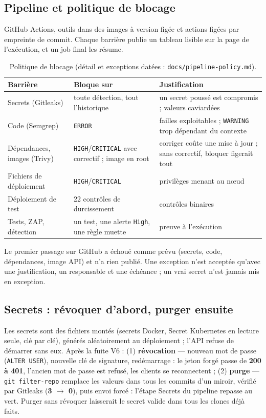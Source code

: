 \documentclass[11pt,a4paper]{article}
\newcommand{\code}[1]{\texttt{\small #1}}
\begin{document}
\subsection{Pipeline et politique de blocage}
GitHub Actions, outils dans des images à version figée et actions figées par empreinte de commit. Chaque
barrière publie un tableau lisible sur la page de l'exécution, et un job final les résume.

\begin{table}[H]
\small
\begin{tabularx}{\linewidth}{@{}L{3.6cm}L{4.2cm}Y@{}}
\toprule
\textbf{Barrière} & \textbf{Bloque sur} & \textbf{Justification} \\
\midrule
Secrets (Gitleaks) & toute détection, tout l'historique & un secret poussé est compromis ; valeurs caviardées \\
Code (Semgrep) & \code{ERROR} & failles exploitables ; \code{WARNING} trop dépendant du contexte \\
Dépendances, images (Trivy) & \code{HIGH}/\code{CRITICAL} avec correctif ; image en root & corriger coûte une mise à jour ; sans correctif, bloquer figerait tout \\
Fichiers de déploiement & \code{HIGH}/\code{CRITICAL} & privilèges menant au nœud \\
Déploiement de test & 22 contrôles de durcissement & contrôles binaires \\
Tests, ZAP, détection & un test, une alerte \code{High}, une règle muette & preuve à l'exécution \\
\bottomrule
\end{tabularx}
\caption{Politique de blocage (détail et exceptions datées : \code{docs/pipeline-policy.md}).}
\end{table}

Le premier passage sur GitHub a échoué comme prévu (secrets, code, dépendances, image API) et n'a rien
publié. Une exception n'est acceptée qu'avec une justification, un responsable et une échéance ; un vrai
secret n'est jamais mis en exception.

\subsection{Secrets : révoquer d'abord, purger ensuite}
Les secrets sont des fichiers montés (secrets Docker, Secret Kubernetes en lecture seule, clé par clé),
générés aléatoirement au déploiement ; l'API refuse de démarrer sans eux. Après la fuite V6 : (1)
\textbf{révocation} --- nouveau mot de passe (\code{ALTER USER}), nouvelle clé de signature, redémarrage :
le jeton forgé passe de \textbf{200 à 401}, l'ancien mot de passe est refusé, les clients se reconnectent ;
(2) \textbf{purge} --- \code{git filter-repo} remplace les valeurs dans tous les commits d'un miroir, vérifié
par Gitleaks (\textbf{3 $\rightarrow$ 0}), puis envoi forcé : l'étape \og Secrets \fg{} du pipeline
repasse au vert. Purger sans révoquer laisserait le secret valide dans tous les
clones déjà faits.
\end{document}
